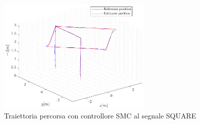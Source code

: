 \begin{figure}
	\centering
	\includegraphics[width=0.65\textwidth]{Simulazioni/Figure/SMC/SQUARE/Trajectory}
	\caption{Traiettoria percorsa con controllore SMC al segnale SQUARE}
	\label{fig:SQUAREtraSMC}
\end{figure}

